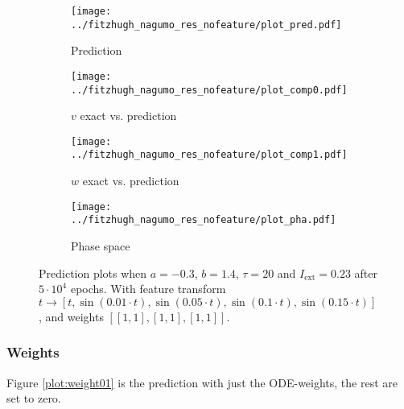 \documentclass[a4paper]{article}
\begin{document}
\begin{figure}[H]
	\centering 
	\begin{subfigure}[b]{0.47\textwidth}
		\centering
		\texttt{[image: ../fitzhugh\_nagumo\_res\_nofeature/plot\_pred.pdf]}
		\caption{Prediction}
		\label{fig:all06a}
	\end{subfigure}
	\begin{subfigure}[b]{0.47\textwidth}
		\centering
		\texttt{[image: ../fitzhugh\_nagumo\_res\_nofeature/plot\_comp0.pdf]}
		\caption{$v$ exact vs. prediction}
		\label{fig:all06b}
	\end{subfigure}
	\begin{subfigure}[b]{0.47\textwidth}
		\centering
		\texttt{[image: ../fitzhugh\_nagumo\_res\_nofeature/plot\_comp1.pdf]}
		\caption{$w$ exact vs. prediction}
		\label{fig:all06c}
	\end{subfigure}
	\begin{subfigure}[b]{0.47\textwidth}
		\centering
		\texttt{[image: ../fitzhugh\_nagumo\_res\_nofeature/plot\_pha.pdf]}
		\caption{Phase space}
		\label{fig:all06d}
	\end{subfigure}
	\caption{Prediction plots when $a=-0.3$, $b=1.4$, $\tau=20$ and $ I_{\text{ext}}=0.23$ after $5\cdot10^4$ epochs. With feature transform $t \rightarrow \left[ t, \sin(0.01 \cdot  t), \sin(0.05 \cdot  t), \sin(0.1 \cdot  t), \sin(0.15 \cdot  t)\right] $, and weights $\left[ \left[ 1, 1\right], \left[ 1, 1\right], \left[ 1, 1\right]\right]$.}
	\label{plot:all06}
\end{figure}



\subsubsection{Weights}

Figure \ref{plot:weight01} is the prediction with just the ODE-weights, the rest are set to zero.
\end{document}
